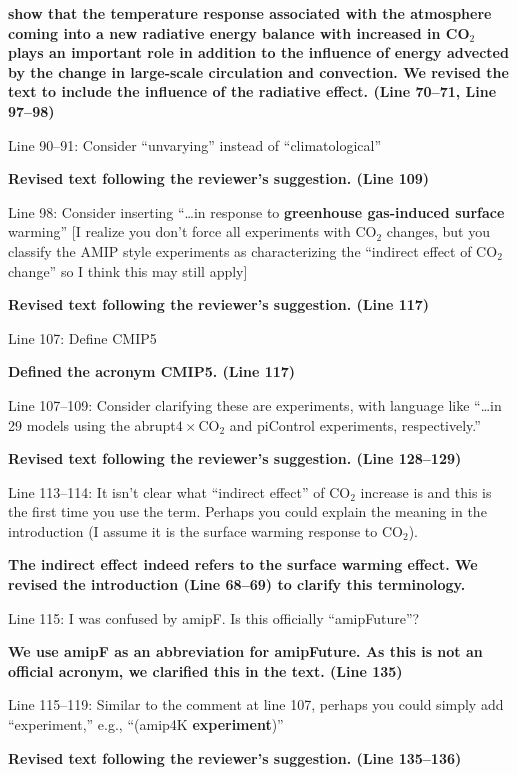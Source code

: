\documentclass[11pt]{article}
\begin{document}
\cite{wang_understanding_2020} \textbf{show that the temperature response associated with the atmosphere coming into a new radiative energy balance with increased in CO$_2$ plays an important role in addition to the influence of energy advected by the change in large-scale circulation and convection. We revised the text to include the influence of the radiative effect. (Line 70--71, Line 97--98)}

Line 90--91: Consider ``unvarying'' instead of ``climatological''

\textbf{Revised text following the reviewer's suggestion. (Line 109)}

Line 98: Consider inserting ``\ldots{}in response to \textbf{greenhouse gas-induced surface} warming'' [I realize you don't force all experiments with CO\(_2\) changes, but you classify the AMIP style experiments as characterizing the ``indirect effect of CO\(_2\) change'' so I think this may still apply]

\textbf{Revised text following the reviewer's suggestion. (Line 117)}

Line 107: Define CMIP5

\textbf{Defined the acronym CMIP5. (Line 117)}

Line 107--109: Consider clarifying these are experiments, with language like ``\ldots{}in 29 models using the abrupt\(4\times\)CO\(_2\) and piControl experiments, respectively.''

\textbf{Revised text following the reviewer's suggestion. (Line 128--129)}

Line 113--114: It isn't clear what ``indirect effect'' of CO\(_2\) increase is and this is the first time you use the term. Perhaps you could explain the meaning in the introduction (I assume it is the surface warming response to CO\(_2\)).

\textbf{The indirect effect indeed refers to the surface warming effect. We revised the introduction (Line 68--69) to clarify this terminology.}

Line 115: I was confused by amipF. Is this officially ``amipFuture''?

\textbf{We use amipF as an abbreviation for amipFuture. As this is not an official acronym, we clarified this in the text. (Line 135)}

Line 115--119: Similar to the comment at line 107, perhaps you could simply add ``experiment,'' e.g., ``(amip4K \textbf{experiment})''

\textbf{Revised text following the reviewer's suggestion. (Line 135--136)}
\end{document}
